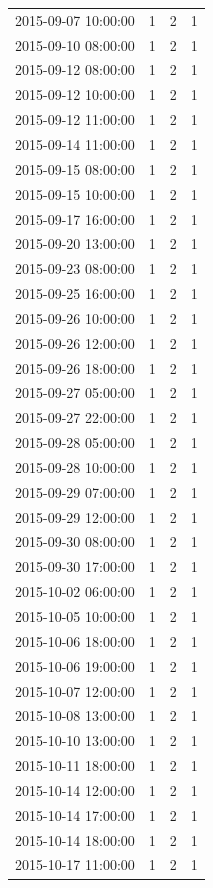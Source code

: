 \begin{tabular}{lrrr}
2015-09-07 10:00:00 & 1 & 2 & 1 \\
2015-09-10 08:00:00 & 1 & 2 & 1 \\
2015-09-12 08:00:00 & 1 & 2 & 1 \\
2015-09-12 10:00:00 & 1 & 2 & 1 \\
2015-09-12 11:00:00 & 1 & 2 & 1 \\
2015-09-14 11:00:00 & 1 & 2 & 1 \\
2015-09-15 08:00:00 & 1 & 2 & 1 \\
2015-09-15 10:00:00 & 1 & 2 & 1 \\
2015-09-17 16:00:00 & 1 & 2 & 1 \\
2015-09-20 13:00:00 & 1 & 2 & 1 \\
2015-09-23 08:00:00 & 1 & 2 & 1 \\
2015-09-25 16:00:00 & 1 & 2 & 1 \\
2015-09-26 10:00:00 & 1 & 2 & 1 \\
2015-09-26 12:00:00 & 1 & 2 & 1 \\
2015-09-26 18:00:00 & 1 & 2 & 1 \\
2015-09-27 05:00:00 & 1 & 2 & 1 \\
2015-09-27 22:00:00 & 1 & 2 & 1 \\
2015-09-28 05:00:00 & 1 & 2 & 1 \\
2015-09-28 10:00:00 & 1 & 2 & 1 \\
2015-09-29 07:00:00 & 1 & 2 & 1 \\
2015-09-29 12:00:00 & 1 & 2 & 1 \\
2015-09-30 08:00:00 & 1 & 2 & 1 \\
2015-09-30 17:00:00 & 1 & 2 & 1 \\
2015-10-02 06:00:00 & 1 & 2 & 1 \\
2015-10-05 10:00:00 & 1 & 2 & 1 \\
2015-10-06 18:00:00 & 1 & 2 & 1 \\
2015-10-06 19:00:00 & 1 & 2 & 1 \\
2015-10-07 12:00:00 & 1 & 2 & 1 \\
2015-10-08 13:00:00 & 1 & 2 & 1 \\
2015-10-10 13:00:00 & 1 & 2 & 1 \\
2015-10-11 18:00:00 & 1 & 2 & 1 \\
2015-10-14 12:00:00 & 1 & 2 & 1 \\
2015-10-14 17:00:00 & 1 & 2 & 1 \\
2015-10-14 18:00:00 & 1 & 2 & 1 \\
2015-10-17 11:00:00 & 1 & 2 & 1 \\

\end{tabular}
